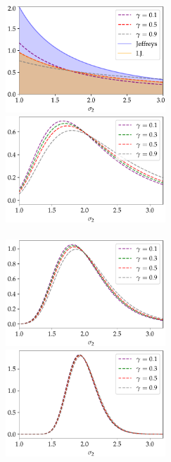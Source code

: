 \begin{figure}[h]%
    \centering%
    \includegraphics[width=6cm]{figures/constrained-priors/priors_.pdf}\hspace*{1cm}%
    \includegraphics[width=6cm]{figures/constrained-priors/post5.pdf}\\
    \\[5pt]
    \includegraphics[width=6cm]{figures/constrained-priors/post15.pdf}\hspace*{1cm}%
    \includegraphics[width=6cm]{figures/constrained-priors/post50.pdf}\\

\end{figure}
